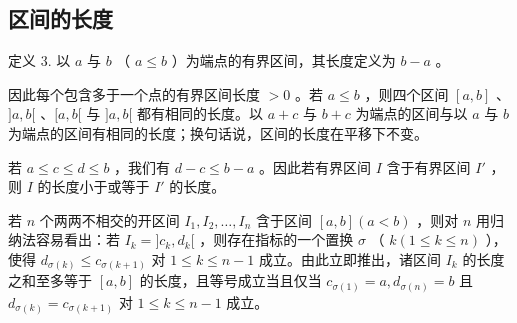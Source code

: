 \subsection{区间的长度}

定义 3. 以 \(a\) 与 \(b\) （ \(a \leqslant b\) ）为端点的有界区间，其长度定义为 \(b - a\) 。

因此每个包含多于一个点的有界区间长度 \(> 0\) 。若 \(a \leqslant b\) ，则四个区间 \([a, b]\) 、\(]a, b[\) 、\([a, b[\) 与 \(]a, b[\) 都有相同的长度。以 \(a + c\) 与 \(b + c\) 为端点的区间与以 \(a\) 与 \(b\) 为端点的区间有相同的长度；换句话说，区间的长度在平移下不变。

若 \(a \leqslant c \leqslant d \leqslant b\) ，我们有 \(d - c \leqslant b - a\) 。因此若有界区间 \(I\) 含于有界区间 \(I'\) ，则 \(I\) 的长度小于或等于 \(I'\) 的长度。

若 \(n\) 个两两不相交的开区间 \(I_1, I_2, \ldots, I_n\) 含于区间 \([a, b] (a < b)\) ，则对 \(n\) 用归纳法容易看出：若 \(I_k = ]c_k, d_k[\) ，则存在指标的一个置换 \(\sigma\) （ \(k (1 \leqslant k \leqslant n)\) ），使得 \(d_{\sigma(k)} \leqslant c_{\sigma(k+1)}\) 对 \(1 \leqslant k \leqslant n - 1\) 成立。由此立即推出，诸区间 \(I_k\) 的长度之和至多等于 \([a, b]\) 的长度，且等号成立当且仅当 \(c_{\sigma(1)} = a, d_{\sigma(n)} = b\) 且 \(d_{\sigma(k)} = c_{\sigma(k+1)}\) 对 \(1 \leqslant k \leqslant n - 1\) 成立。

